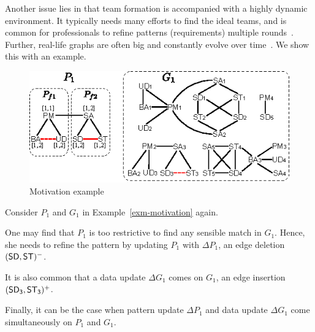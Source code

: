 

Another issue lies in that team formation is accompanied with a highly dynamic environment. It typically needs many efforts to find the ideal teams, and is common for professionals to refine patterns  (requirements) multiple rounds~\cite{SajjadPG12,HabibiP15}. Further, real-life graphs are often big and constantly evolve over time~\cite{FanWW13-tods}. We show this with an example.


\begin{figure}[tb!]
\vspace{-2ex}
\begin{center}
\includegraphics[scale=1.15]{./fig/motivation-example-L.eps}
\end{center}
\vspace{-3ex}
\caption{Motivation example}
\label{fig-motivation-example}
\vspace{-4ex}
\end{figure}



\begin{example}
\label{exm-motivation-inc}
Consider $P_{1}$ and $G_{1}$ in Example~\ref{exm-motivation} again.
	
One may find that $P_1$ is too restrictive to find any sensible match in  $G_{1}$.
Hence, she needs to refine the pattern by updating $P_1$ with $\Delta P_{1}$, \eg an edge
deletion $({\mathsf{SD}},{\mathsf{ST}})^-$.
	
 It is also common that a data update $\Delta G_1$ comes on $G_1$, \eg an edge insertion $({\mathsf{SD_3}},{\mathsf{ST_3}})^+$.
	
 Finally, it can be the case when pattern update $\Delta P_{1}$  and data update $\Delta G_{1}$ come simultaneously on $P_1$ and $G_1$.
\end{example}

